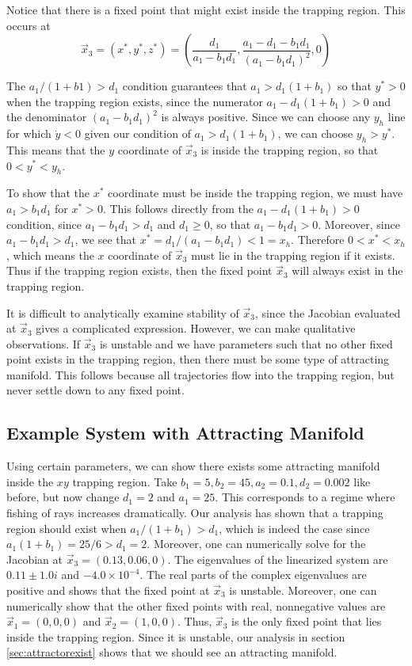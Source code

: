 \documentclass{article}
\begin{document}
Notice that there is a fixed point that might exist inside the trapping region. This occurs at 
\begin{equation}
\vec{x}_3 = (x^{*},y^{*},z^{*}) = \left( \frac{d_1}{a_1 - b_1 d_1}, \frac{a_1 - d_1 - b_1 d_1}{(a_1 - b_1 d_1)^2}, 0 \right)
\end{equation}

The $a_1 / (1 + b1) > d_1$ condition guarantees that $a_1 > d_1 (1 + b_1)$ so that $y^{*} > 0$ when the trapping region exists, since the numerator $a_1 - d_1(1 + b_1) >0$ and the denominator $(a_1 - b_1 d_1)^2$ is always positive. Since we can choose any $y_h$ line for which $\dot{y} < 0$ given our condition of $a_1 > d_1 ( 1 + b_1)$, we can choose $y_h > y^{*}$. This means that the $y$ coordinate of $\vec{x}_3$ is inside the trapping region, so that $0 < y^{*} < y_h$.

To show that the $x^{*}$ coordinate must be inside the trapping region, we must have $a_1 > b_1 d_1$ for $x^{*} > 0$. This follows directly from the $a_1 - d_1(1 + b_1) > 0$ condition, since $a_1 - b_1 d_1 > d_1$ and $d_1 \geq 0$, so that $a_1 - b_1 d_1 > 0$. Moreover, since $a_1 - b_1 d_1 > d_1$, we see that $x^{*} = d_1 / (a_1 - b_1 d_1) < 1 = x_h$. Therefore $0 < x^{*} < x_h$, which means the $x$ coordinate of $\vec{x}_3$ must lie in the trapping region if it exists. Thus if the trapping region exists, then the fixed point $\vec{x}_3$ will always exist in the trapping region. 

It is difficult to analytically examine stability of $\vec{x}_3$, since the Jacobian evaluated at $\vec{x}_3$ gives a complicated expression. However, we can make qualitative observations. If $\vec{x}_3$ is unstable and we have parameters such that no other fixed point exists in the trapping region, then there must be some type of attracting manifold. This follows because all trajectories flow into the trapping region, but never settle down to any fixed point. 

\subsection{Example System with Attracting Manifold}

Using certain parameters, we can show there exists some attracting manifold inside the $xy$ trapping region. Take $b_1 = 5, b_2 = 45, a_2 = 0.1, d_2 = 0.002$ like before, but now change $d_1 = 2$ and $a_1 = 25$. This corresponds to a regime where fishing of rays increases dramatically. Our analysis has shown that a trapping region should exist when $a_1 / (1 + b_1) > d_1$, which is indeed the case since $a_1 ( 1 + b_1) = 25 / 6 > d_1 = 2$. Moreover, one can numerically solve for the Jacobian at $\vec{x}_3 = (0.13, 0.06, 0)$. The eigenvalues of the linearized system are $0.11 \pm 1.0i$ and $-4.0 \times 10^{-4}$. The real parts of the complex eigenvalues are positive and shows that the fixed point at $\vec{x}_3$ is unstable. Moreover, one can numerically show that the other fixed points with real, nonnegative values are $\vec{x}_1 = (0,0,0)$ and  $\vec{x}_2 = (1,0,0)$. Thus, $\vec{x}_3$ is the only fixed point that lies inside the trapping region. Since it is unstable, our analysis in section \ref{sec:attractorexist} shows that we should see an attracting manifold.
\end{document}
